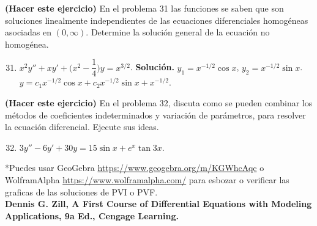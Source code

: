 \documentclass[letterpaper,10pt]{memoir}
\begin{document}
\textbf{(Hacer este ejercicio)} En el problema 31 las funciones se saben que son soluciones linealmente independientes de las ecuaciones diferenciales homogéneas asociadas en \((0, \infty)\). Determine la solución general de la ecuación no homogénea.
\begin{enumerate}
	\setcounter{enumi}{30}
	\item \(x^2y'' +xy' + \Bigg(x^2- \dfrac{1}{4}\Bigg) y=x^{3/2}\). \textbf{Solución.} \(y_1=x^{-1/2} \cos x\), \(y_2=x^{-1/2} \sin x\). \(y=c_1x^{-1/2} \cos x+c_2x^{-1/2} \sin x +x^{-1/2}\).
\end{enumerate}
\textbf{(Hacer este ejercicio)} En el problema 32, discuta como se pueden combinar los métodos de coeficientes indeterminados y variación de parámetros, para resolver la ecuación diferencial. Ejecute sus ideas.
\begin{enumerate}
	\setcounter{enumi}{31}
	\item \(3y'' -6y' +30y=15 \sin x+e^x \tan 3x\).
\end{enumerate}

*Puedes usar GeoGebra \url{https://www.geogebra.org/m/KGWhcAqc} o WolframAlpha \url{https://www.wolframalpha.com/} para esbozar o verificar las graficas de las soluciones de PVI o PVF. \\[5mm]
\textbf{Dennis G. Zill, A First Course of Differential  Equations with Modeling Applications, 9a Ed., Cengage Learning.}
\end{document}
